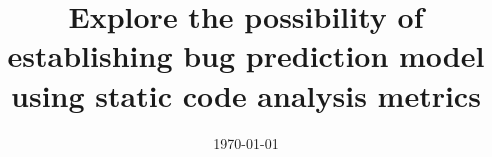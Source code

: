 \documentclass[a4paper, 11pt, oneside]{thesis}  %
\begin{document}
\frontmatter      %

\title  {Explore the possibility of establishing bug prediction model using static code analysis metrics}
            
\addresses  {\groupname\\\deptname\\\univname}  %
\date       {\today}
\subject    {}
\keywords   {}


\maketitle



\fancyhead{}  %
\rhead{\thepage}  %
\lhead{}  %

\pagestyle{fancy}  %
\end{document}
